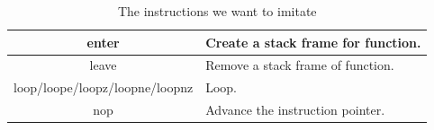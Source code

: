 \documentclass[12pt]{extarticle}
\begin{document}
\begin{table}[h!]
\begin{tabular}{||c | p{9cm}||}
             \hline
             enter & Create a stack frame for function.\\
             \hline
             leave & Remove a stack frame of function.\\
             \hline
             loop/loope/loopz/loopne/loopnz & Loop.\\
             \hline
             nop & Advance the instruction pointer.\\
             \hline
            \end{tabular}
            \caption{The instructions we want to imitate}
            \label{table:2}
        \end{table}


{}

\end{document}
